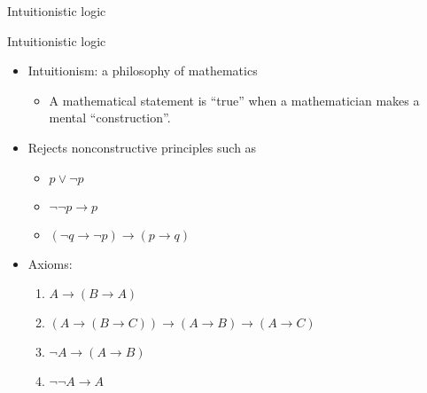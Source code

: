 \documentclass{beamer}
\newcommand{\sect}[1]{\begin{frame}\centerline{\large #1}\end{frame}}
\begin{document}
\sect{Intuitionistic logic}

\begin{frame}{Intuitionistic logic}
\begin{itemize}
\item Intuitionism: a philosophy of mathematics
    \begin{itemize}
    \item A mathematical statement is ``true''
        when a mathematician makes a mental ``construction''.
    \end{itemize}
\item Rejects nonconstructive principles such as
    \begin{itemize}
    \item $p\lor\lnot p$
    \item $\lnot\lnot p\to p$
    \item $(\lnot q\to\lnot p)\to (p\to q)$
    \end{itemize}
\item Axioms:
    \begin{enumerate}
    \item $A\to(B\to A)$
    \item $(A\to (B\to C)) \to (A\to B) \to (A\to C)$
    \item $\lnot A\to (A\to B)$
    \item \sout{$\lnot\lnot A\to A$}
    \end{enumerate}
\end{itemize}
\end{frame}
\end{document}

